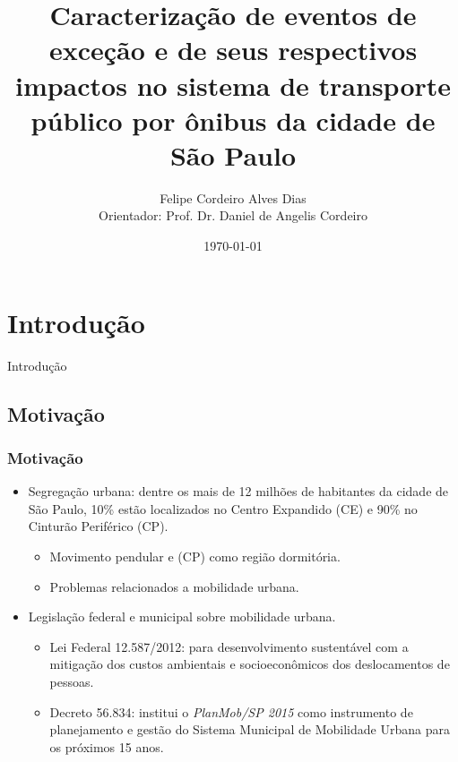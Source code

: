 \documentclass{beamer}
\title[Exame de Qualificação]{Caracterização de eventos de exceção e de seus respectivos impactos no sistema de transporte público por ônibus da cidade de São Paulo} %
\author[DIAS, F.; CORDEIRO, D.]{Felipe Cordeiro Alves Dias\\[1mm]Orientador: Prof. Dr. Daniel de Angelis Cordeiro}
\institute[USP-EACH] %
{
Universidade de São Paulo \\ %
\medskip
}
\date{\today} %
\begin{document}
\begin{frame}
\titlepage %
\end{frame}

\section{Introdução}
\begin{frame}
\Huge{\centerline{Introdução}}
\end{frame}
\subsection{Motivação}
\begin{frame}
\frametitle{Motivação}
\begin{itemize}
\item Segregação urbana: dentre os mais de 12 milhões de habitantes da cidade de São Paulo, 10\% estão localizados no Centro Expandido (CE) e 90\% no Cinturão Periférico (CP).
\begin{itemize}
\item Movimento pendular e (CP) como região dormitória.
\item Problemas relacionados a mobilidade urbana.
\end{itemize}
\end{itemize}

\begin{itemize}
\item Legislação federal e municipal sobre mobilidade urbana.
\begin{itemize}
\item Lei Federal 12.587/2012: para desenvolvimento sustentável com a mitigação dos custos ambientais e socioeconômicos dos deslocamentos de pessoas.
\item Decreto 56.834: institui o \textit{PlanMob/SP 2015} como instrumento de planejamento e gestão do Sistema Municipal de Mobilidade Urbana para os próximos 15 anos.
\end{itemize}
\end{itemize}

\end{frame}
\end{document}
